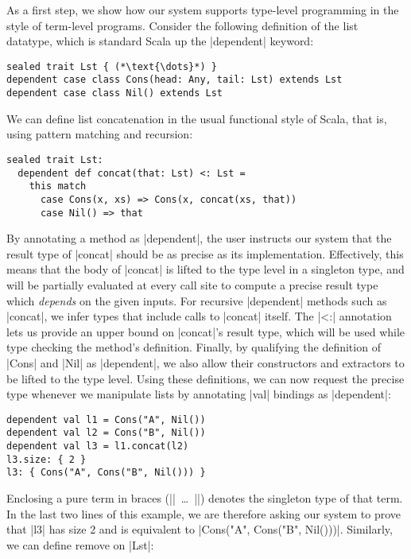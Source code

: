 As a first step, we show how our system supports type-level programming in the style of term-level programs.
Consider the following definition of the list datatype, which is standard Scala up the |dependent| keyword:

\begin{lstlisting}
sealed trait Lst { (*\text{\dots}*) }
dependent case class Cons(head: Any, tail: Lst) extends Lst
dependent case class Nil() extends Lst
\end{lstlisting}

\noindent
We can define list concatenation in the usual functional style of Scala, that is, using pattern matching and recursion:

\begin{lstlisting}
sealed trait Lst:
  dependent def concat(that: Lst) <: Lst =
    this match
      case Cons(x, xs) => Cons(x, concat(xs, that))
      case Nil() => that
\end{lstlisting}

\noindent
By annotating a method as |dependent|, the user instructs our system that the result type of |concat| should be as precise as its implementation.
Effectively, this means that the body of |concat| is lifted to the type level in a singleton type, and will be partially evaluated at every call site to compute a precise result type which \emph{depends} on the given inputs.
For recursive |dependent| methods such as |concat|, we infer types that include calls to |concat| itself.
The |<:| annotation lets us provide an upper bound on |concat|'s result type, which will be used while type checking the method's definition.
Finally, by qualifying the definition of |Cons| and |Nil| as |dependent|, we also allow their constructors and extractors to be lifted to the type level.
Using these definitions, we can now request the precise type whenever we manipulate lists by annotating |val| bindings as |dependent|:

\begin{lstlisting}
dependent val l1 = Cons("A", Nil())
dependent val l2 = Cons("B", Nil())
dependent val l3 = l1.concat(l2)
l3.size: { 2 }
l3: { Cons("A", Cons("B", Nil())) }
\end{lstlisting}

Enclosing a pure term in braces (|{|~\ldots{}~|}|) denotes the singleton type of that term.
In the last two lines of this example, we are therefore asking our system to prove that |l3| has size 2 and is equivalent to |Cons("A", Cons("B", Nil()))|.
Similarly, we can define remove on |Lst|:

